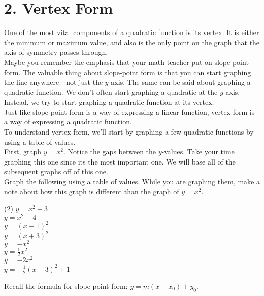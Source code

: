 \documentclass[12pt,fleqn]{book}
\begin{document}
\chapter{2. Vertex Form}
One of the most vital components of a quadratic function is its vertex.  It is either the minimum or maximum value, and also is the only point on the graph that the axis of symmetry passes through.
\\[1em]
Maybe you remember the emphasis that your math teacher put on slope-point form.  The valuable thing about slope-point form is that you can start graphing the line anywhere - not just the $y$-axis.  The same can be said about graphing a quadratic function.  We don't often start graphing a quadratic at the $y$-axis.  Instead, we try to start graphing a quadratic function at its vertex.
\\[1em]
Just like slope-point form is a way of expressing a linear function, vertex form is a way of expressing a quadratic function.
\\[1em]
To understand vertex form, we'll start by graphing a few quadratic functions by using a table of values.
\\[1em]
First, graph $y=x^2$.  Notice the gaps between the $y$-values.  Take your time graphing this one since its the most important one.  We will base all of the subsequent graphs off of this one.
\\[1em]
\clearpage
Graph the following using a table of values.  While you are graphing them, make a note about how this graph is different than the graph of $y=x^2.$ \begin{tasks}(2)
	\task $y=x^2 + 3$
	\\[1em]
	\task $y=x^2 - 4$
	\\[1em]
	\task $y=(x-1)^2$
	\\[1em]
	\task $y=(x+3)^2$
	\\[1em]
	\task $y=-x^2$
	\\[1em]
	\task $y=\frac12 x^2$
	\\[1em]
	\task $y=-2x^2$
	\\[1em]
	\task $y=-\frac 12 (x-3)^2+1$
	\\[1em]
\end{tasks}
\clearpage
Recall the formula for slope-point form: $y=m(x-x_0)+y_0$.
\end{document}

